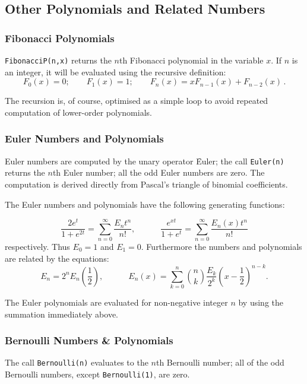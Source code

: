 \subsection{Other Polynomials and Related Numbers}

\subsubsection{Fibonacci Polynomials}
\texttt{FibonacciP(n,x)} returns the $n$th Fibonacci polynomial
in the variable $x$. If $n$ is an integer, it will be
evaluated using the recursive definition:
\[F_0(x) = 0;\qquad F_1(x) = 1; \qquad F_n(x) = x F_{n-1}(x) + F_{n-2}(x)\,.\]

The recursion is, of course, optimised as a simple loop to avoid repeated
computation of lower-order polynomials.

\subsubsection{Euler Numbers and Polynomials}
\hypertarget{operator:EULERP}{}
Euler numbers are computed by the unary operator \f{Euler}; the
call \texttt{Euler(n)} returns the $n$th Euler number; all the odd Euler
numbers are zero. The computation is
derived directly from Pascal's triangle of binomial coefficients.

The Euler numbers and polynomials have the following generating functions:

\[\frac {2e^t} {1+e^{2t}} = \sum_{n=0}^{\infty}\frac{E_nt^n}{n!},\qquad\quad
\frac {e^{x t}} {1+e^t} = \sum_{n=0}^{\infty}\frac{E_n(x)t^n}{n!}\]
respectively.  Thus $E_0=1$ and $E_1=0$. Furthermore the numbers and
polynomials are related by the equations:
\[ E_n = 2^nE_n\left(\frac{1}{2}\right),\qquad\quad
E_n(x) = \sum_{k=0}^n \binom{n}{k} \frac{E_k}{2^k} \left(x-\frac{1}{2}\right)^{n-k}.\]

The Euler polynomials are evaluated for non-negative integer $n$ by using
the summation immediately above.

\subsubsection{Bernoulli Numbers \& Polynomials}
\hypertarget{operator:BERNOULLIP}{}
The call \texttt{Bernoulli(n)}
evaluates to the $n$th Bernoulli number;
all of the odd Bernoulli numbers, except \texttt{Bernoulli(1)}, are
zero.


